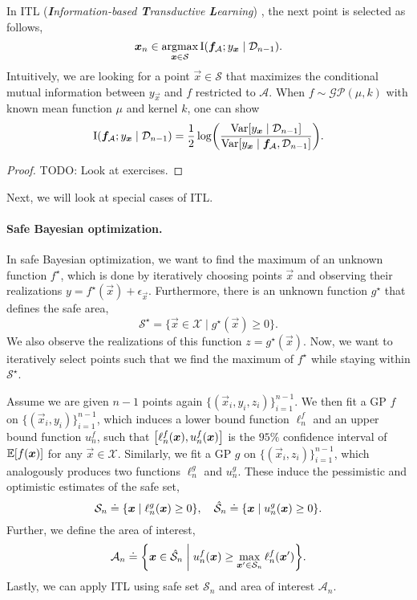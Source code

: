 In ITL (\textit{\textbf{I}nformation-based \textbf{T}ransductive \textbf{L}earning})
\citep{hubotter2024information}, the next point is selected as follows, \[
    \vec{x}_n \in \argmax_{\vec{x} \in \mathcal{S}} \mathrm{I} \lft( \vec{f}_{\mathcal{A}}; y_{\vec{x}} \mid \mathcal{D}_{n-1} \rgt).
\]
Intuitively, we are looking for a point $\vec{x} \in \mathcal{S}$ that maximizes the conditional
mutual information between $y_{\vec{x}}$ and $f$ restricted to $\mathcal{A}$. When $f \sim
    \mathcal{GP}(\mu, k)$ with known mean function $\mu$ and kernel $k$, one can show \[
    \mathrm{I} \lft( \vec{f}_{\mathcal{A}}; y_{\vec{x}} \mid \mathcal{D}_{n-1} \rgt) = \frac{1}{2} \log \lft( \frac{\Var[y_{\vec{x}} \mid \mathcal{D}_{n-1}]}{\Var[y_{\vec{x}} \mid \vec{f}_{\mathcal{A}}, \mathcal{D}_{n-1}]} \rgt).
\]

\begin{proof}
    TODO: Look at exercises.
\end{proof}

Next, we will look at special cases of ITL.

\paragraph{Safe Bayesian optimization.}

In safe Bayesian optimization, we want to find the maximum of an unknown function $f^\star$, which
is done by iteratively choosing points $\vec{x}$ and observing their realizations $y =
    f^\star(\vec{x}) + \epsilon_{\vec{x}}$. Furthermore, there is an unknown function $g^\star$ that
defines the safe area, \[
    \mathcal{S}^\star = \{ \vec{x} \in \mathcal{X} \mid g^\star(\vec{x}) \geq 0 \}.
\]
We also observe the realizations of this function $z = g^\star(\vec{x})$. Now, we want to
iteratively select points such that we find the maximum of $f^\star$ while staying within
$\mathcal{S}^\star$.

Assume we are given $n-1$ points again $\{ (\vec{x}_i, y_i, z_i) \}_{i=1}^{n-1}$. We then fit a GP
$f$ on $\{ (\vec{x}_i, y_i) \}_{i=1}^{n-1}$, which induces a lower bound function $\ell_n^f$ and an
upper bound function $u_n^f$, such that $\lft[\ell_n^f(\vec{x}), u_n^f(\vec{x})\rgt]$ is the $95\%$
confidence interval of $\mathbb{E}[f(\bm{x})]$ for any $\vec{x} \in \mathcal{X}$. Similarly, we fit a GP
$g$ on $\{ (\vec{x}_i, z_i) \}_{i=1}^{n-1}$, which analogously produces two functions $\ell_n^g$
and $u_n^g$. These induce the pessimistic and optimistic estimates of the safe set, \[
    \mathcal{S}_n \doteq \lft\{ \vec{x} \;\middle|\; \ell_n^g(\vec{x}) \geq 0 \rgt\}, \quad \hat{\mathcal{S}}_n \doteq \lft\{ \vec{x} \;\middle|\; u_n^g(\vec{x}) \geq 0 \rgt\}.
\]
Further, we define the area of interest, \[
    \mathcal{A}_n \doteq \lft\{ \vec{x} \in \hat{\mathcal{S}}_n \;\middle|\; u_n^f(\vec{x}) \geq \max_{\vec{x}' \in \mathcal{S}_n} \ell_n^f(\vec{x}') \rgt\}.
\]
Lastly, we can apply ITL using safe set $\mathcal{S}_n$ and area of interest $\mathcal{A}_n$.

